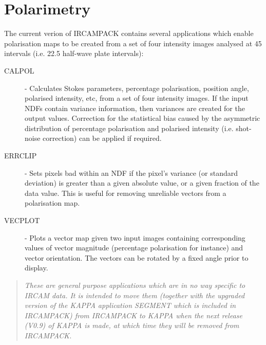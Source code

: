 \section{Polarimetry}

The current verion of {\small IRCAMPACK} contains several applications
which enable polarisation maps to be created from a set of four
intensity images analysed at 45\dgs \hspace*{0.1mm} intervals (i.e.
22.5\dgs \hspace*{0.1mm} half-wave plate intervals):

\begin{description}

\item [CALPOL] - Calculates Stokes parameters, percentage polarisation,
position angle, polarised intensity, etc, from a set of four intensity
images. If the input {\small NDF}s contain variance information, then
variances are created for the output values. Correction for the
statistical bias caused by the asymmetric distribution of percentage
polarisation and polarised intensity (i.e. shot-noise correction) can
be applied if required.

\item [ERRCLIP] - Sets pixels bad within an {\small NDF} if the pixel's
variance (or standard deviation) is greater than a given absolute
value, or a given fraction of the data value. This is useful for
removing unreliable vectors from a polarisation map.

\item [VECPLOT] - Plots a vector map given two input images containing
corresponding values of vector magnitude (percentage polarisation for
instance) and vector orientation. The vectors can be rotated by a fixed
angle prior to display.

\end{description}

\begin{quote}
\begin{center}

{\em These are general purpose applications which are in no way
specific to {\small IRCAM} data. It is intended to move them (together
with the upgraded version of the {\small KAPPA} application {\small
SEGMENT} which is included in {\small IRCAMPACK}) from {\small
IRCAMPACK} to {\small KAPPA} when the next release (V0.9) of {\small
KAPPA} is made, at which time they will be removed from {\small
IRCAMPACK}.}

\end{center}
\end{quote}

